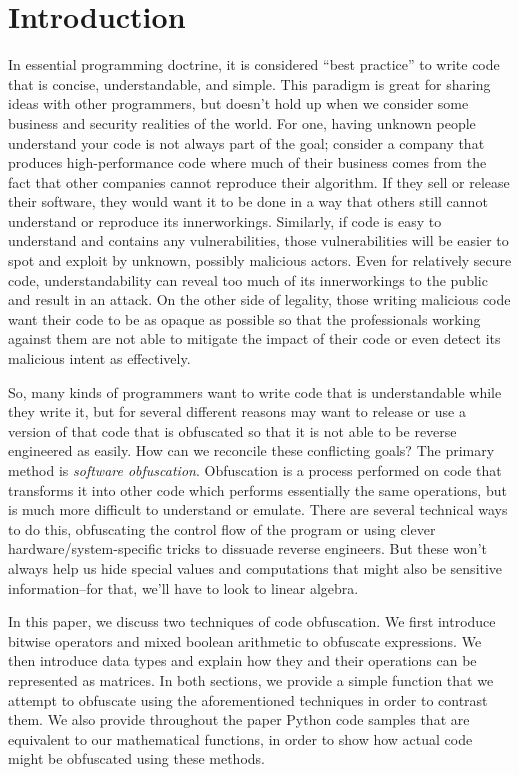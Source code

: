 \section{Introduction}
In essential programming doctrine, it is considered ``best practice'' to write code that
is concise, understandable, and simple. This paradigm is great for sharing ideas
with other programmers, but doesn't hold up when we consider some business and
security realities of the world. For one, having unknown people understand
your code is not always part of the goal; consider a company that produces
high-performance code where much of their business comes from the fact that
other companies cannot reproduce their algorithm. If they sell or
release their software, they would want it to be done in a way that others still
cannot understand or reproduce its innerworkings.
Similarly, if code is easy to understand and contains any vulnerabilities,
those vulnerabilities will be easier to spot and exploit by unknown, possibly
malicious actors. Even for relatively secure code, understandability can reveal
too much of its innerworkings to the public and result in an attack. On the 
other side of legality, those writing malicious code want their code to be 
as opaque as possible so that the professionals working against them are not
able to mitigate the impact of their code or even detect its malicious intent
as effectively.
\par So, many kinds of programmers want to write code that is understandable
while they write it, but for several different reasons may want to release or
use a version of that code that is obfuscated so that it is not
able to be reverse engineered as easily. How can we reconcile
these conflicting goals? The primary method is {\itshape software obfuscation}.
Obfuscation is a process performed on code that transforms it into other code
which performs essentially the same operations, but is much more difficult to
understand or emulate. There are several technical ways to do this, obfuscating
the control flow of the program or using clever hardware/system-specific tricks
to dissuade reverse engineers. But these won't always help us hide special values
and computations that might also be sensitive information--for that, we'll have to
look to linear algebra.

In this paper, we discuss two techniques of code obfuscation. We first
introduce bitwise operators and mixed boolean arithmetic to obfuscate
expressions. We then introduce data types and explain how they and
their operations can be represented as matrices. In both sections, we provide a
simple function that we attempt to obfuscate using the aforementioned
techniques in order to contrast them. We also provide throughout the paper
Python code samples that are equivalent to our mathematical functions, in order
to show how actual code might be obfuscated using these methods.
